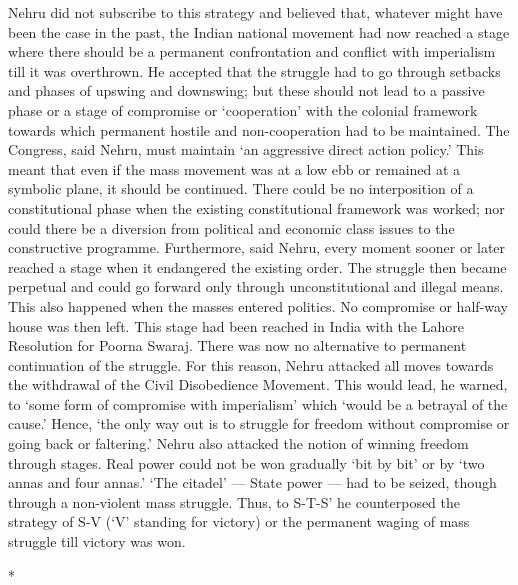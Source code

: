 \begin{multicols}{2}
Nehru did not subscribe to this strategy and believed that, whatever might have been the case in the past, the Indian national movement had now reached a stage where there should be a permanent confrontation and conflict with imperialism till it was overthrown. He accepted that the struggle had to go through setbacks and phases of upswing and downswing; but these should not lead to a passive phase or a stage of compromise or `cooperation' with the colonial framework towards which permanent hostile and non-cooperation had to be maintained. The Congress, said Nehru, must maintain `an aggressive direct action policy.' This meant that even if the mass movement was at a low ebb or remained at a symbolic plane, it should be continued. There could be no interposition of a constitutional phase when the existing constitutional framework was worked; nor could there be a diversion from political and economic class issues to the constructive programme. Furthermore, said Nehru, every moment sooner or later reached a stage when it endangered the existing order. The struggle then became perpetual and could go forward only through unconstitutional and illegal means. This also happened when the masses entered politics. No compromise or half-way house was then left. This stage had been reached in India with the Lahore Resolution for Poorna Swaraj. There was now no alternative to permanent continuation of the struggle. For this reason, Nehru attacked all moves towards the withdrawal of the Civil Disobedience Movement. This would lead, he warned, to `some form of compromise with imperialism' which `would be a betrayal of the cause.' Hence, `the only way out is to struggle for freedom without compromise or going back or faltering.' Nehru also attacked the notion of winning freedom through stages. Real power could not be won gradually `bit by bit' or by `two annas and four annas.' `The citadel' --- State power --- had to be seized, though through a non-violent mass struggle. Thus, to S-T-S' he counterposed the strategy of S-V (`V' standing for victory) or the permanent waging of mass struggle till victory was won.

\begin{center}*\end{center}

\paragraph*{}


\end{multicols}

